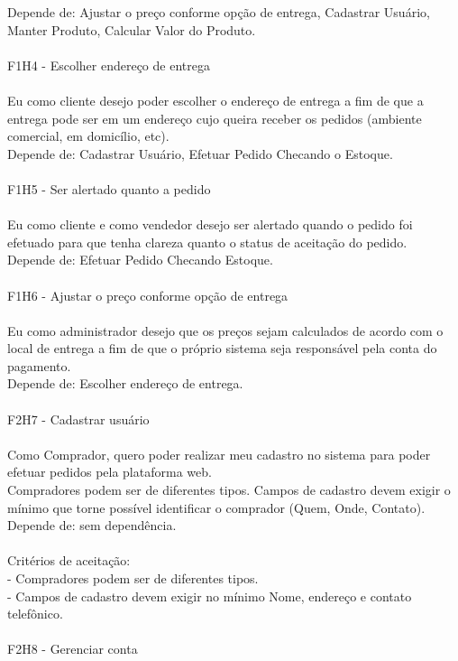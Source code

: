 \tab Depende de: Ajustar o preço conforme opção de entrega, Cadastrar Usuário, Manter Produto, Calcular Valor do Produto.\\
\\
\tab F1H4 - Escolher endereço de entrega\\
\\
\tab Eu como cliente desejo poder escolher o endereço de entrega a fim de que a entrega pode ser em um endereço cujo queira receber os pedidos (ambiente comercial, em domicílio, etc).\\
\tab Depende de: Cadastrar Usuário, Efetuar Pedido Checando o Estoque.\\
\\
\tab F1H5 - Ser alertado quanto a pedido\\
\\
\tab Eu como cliente e como vendedor desejo ser alertado quando o pedido foi efetuado para que tenha clareza quanto o status de aceitação do pedido.\\
\tab Depende de: Efetuar Pedido Checando Estoque.\\
\\
\tab F1H6 - Ajustar o preço conforme opção de entrega\\
\\
\tab Eu como administrador desejo que os preços sejam calculados de acordo com o local de entrega a fim de que o próprio sistema seja responsável pela conta do pagamento.\\
\tab Depende de: Escolher endereço de entrega.\\
\\
\tab F2H7 - Cadastrar usuário\\
\\
\tab Como Comprador, quero poder realizar meu cadastro no sistema para poder efetuar pedidos pela plataforma web.\\
\tab Compradores podem ser de diferentes tipos. Campos de cadastro devem exigir o mínimo que torne possível identificar o comprador (Quem, Onde, Contato).\\
\tab Depende de: sem dependência.\\
\\
\tab Critérios de aceitação:\\
\tab - Compradores podem ser de diferentes tipos.\\
\tab - Campos de cadastro devem exigir no mínimo Nome, endereço e contato telefônico.\\
\\
\tab F2H8 - Gerenciar conta\\
